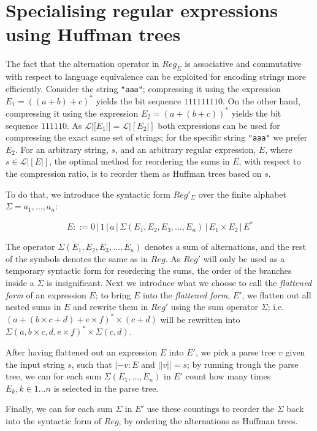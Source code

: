 \documentclass[a4paper, oneside]{memoir}
\theoremstyle{definition}
\begin{document}
\chapter{Specialising regular expressions using Huffman trees}
\label{chap:huffman}

The fact that the alternation operator in $Reg_{\Sigma}$ is associative and
commutative with respect to language equivalence can be exploited for encoding
strings more efficiently. Consider the string \texttt{"aaa"}; compressing it
using the expression $E_1 = ((a + b) + c)^{*}$ yields the bit sequence
$111111110$. On the other hand, compressing it using the expression $E_2 = (a +
(b + c))^{*}$ yields the bit sequence $111110$. As $\mathcal{L}|[E_1|] =
\mathcal{L}|[E_2|]$ both expressions can be used for compressing the exact same
set of strings; for the specific string \texttt{"aaa"} we prefer $E_2$. For an
arbitrary string, $s$, and an arbitrary regular expression, $E$, where $s \in
\mathcal{L}|[E|]$, the optimal method for reordering the sums in $E$, with
respect to the compression ratio, is to reorder them as Huffman trees based on
$s$.

To do that, we introduce the syntactic form $Reg'_\Sigma$ over the finite
alphabet $\Sigma = {a_1, \dots, a_n}$:

\[
    E ::= 0 \, | \, 1 \, | \, a \, | \, \Sigma(E_1, E_2, E_3, \dots, E_n) \, | \, E_1 \times E_2 \, | \, E^{*}
\]

The operator $\Sigma(E_1, E_2, E_3, \dots, E_n)$ denotes a sum of alternations,
and the rest of the symbols denotes the same as in $Reg$. As $Reg'$ will only be
used as a temporary syntactic form for reordering the sums, the order of the
branches inside a $\Sigma$ is insignificant. Next we introduce what we choose to
call the \emph{flattened form} of an expression $E$; to bring $E$ into the
\emph{flattened form}, $E'$, we flatten out all nested sums in $E$ and rewrite
them in $Reg'$ using the sum operator $\Sigma$; i.e. $(a + (b \times c + d) + e
\times f)^{*} \times (c + d)$ will be rewritten into $\Sigma(a, b \times c, d, e
\times f)^{*} \times \Sigma{(c, d)}$.

After having flattened out an expression $E$ into $E'$, we pick a parse tree
$v$ given the input string $s$, such that $|- v : E$ and $||v|| = s$; by
running trough the parse tree, we can for each sum $\Sigma(E_1, \dots, E_n)$ in
$E'$ count how many times $E_k, k \in 1 \dots n$ is selected in the parse tree.

Finally, we can for each sum $\Sigma$ in $E'$ use these countings to reorder the
$\Sigma$ back into the syntactic form of $Reg$, by ordering the alternations as
Huffman trees.
\end{document}

